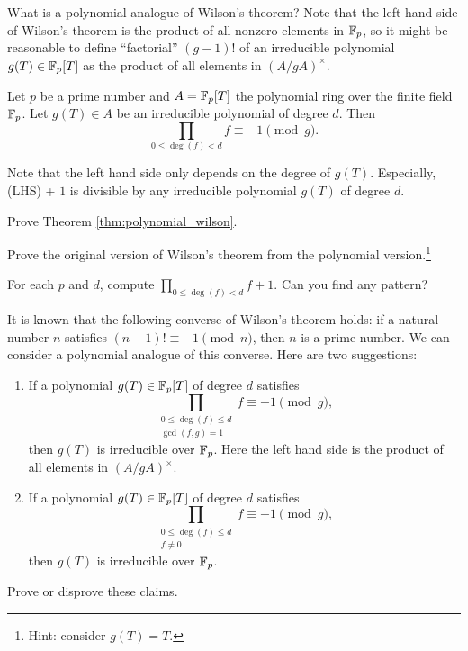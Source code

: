 What is a polynomial analogue of Wilson's theorem?
Note that the left hand side of Wilson's theorem is the product of all nonzero elements in $\mathbb{F}_p$, so it might be reasonable to define ``factorial'' $(g - 1)!$ of an irreducible polynomial $g(T) \in \mathbb{F}_p[T]$ as the product of all elements in $(A / gA)^\times$.

\begin{theorem}
    \label{thm:polynomial_wilson}
    Let $p$ be a prime number and $A = \mathbb{F}_p[T]$ the polynomial ring over the finite field $\mathbb{F}_p$.
    Let $g(T) \in A$ be an irreducible polynomial of degree $d$.
    Then
    \[
        \prod_{0 \le \deg(f) < d} f \equiv -1 \pmod{g}.
    \]
\end{theorem}

Note that the left hand side only depends on the degree of $g(T)$.
Especially, (LHS) + $1$ is divisible by any irreducible polynomial $g(T)$ of degree $d$.

\begin{exercise}
    Prove Theorem \ref{thm:polynomial_wilson}.
\end{exercise}

\begin{exercise}
    Prove the original version of Wilson's theorem from the polynomial version.\footnote{Hint: consider $g(T) = T$.} 
\end{exercise}

\begin{exercise}\sage
    For each $p$ and $d$, compute $\prod_{0 \le \deg(f) < d} f + 1$. Can you find any pattern?
\end{exercise}

\begin{exercise}
    It is known that the following converse of Wilson's theorem holds: if a natural number $n$ satisfies $(n - 1)! \equiv -1 \pmod{n}$, then $n$ is a prime number.
    We can consider a polynomial analogue of this converse.
    Here are two suggestions:
    \begin{enumerate}
        \item If a polynomial $g(T) \in \mathbb{F}_p[T]$ of degree $d$ satisfies
        \[
            \prod_{\substack{0 \le \deg(f) \le d \\ \gcd(f, g) = 1}} f \equiv -1 \pmod{g},
        \]
        then $g(T)$ is irreducible over $\mathbb{F}_p$. Here the left hand side is the product of all elements in $(A / gA)^\times$.
        \item If a polynomial $g(T) \in \mathbb{F}_p[T]$ of degree $d$ satisfies
        \[
            \prod_{\substack{0 \le \deg(f) \le d \\ f \ne 0}} f \equiv -1 \pmod{g},
        \]
        then $g(T)$ is irreducible over $\mathbb{F}_p$.
    \end{enumerate}
    Prove or disprove these claims.
\end{exercise}

\newpage
